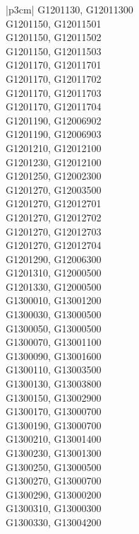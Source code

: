 \begin{customLongTable}{ |p{3cm}| }
G1201130, G12011300 \\ \hline
G1201150, G12011501 \\ \hline
G1201150, G12011502 \\ \hline
G1201150, G12011503 \\ \hline
G1201170, G12011701 \\ \hline
G1201170, G12011702 \\ \hline
G1201170, G12011703 \\ \hline
G1201170, G12011704 \\ \hline
G1201190, G12006902 \\ \hline
G1201190, G12006903 \\ \hline
G1201210, G12012100 \\ \hline
G1201230, G12012100 \\ \hline
G1201250, G12002300 \\ \hline
G1201270, G12003500 \\ \hline
G1201270, G12012701 \\ \hline
G1201270, G12012702 \\ \hline
G1201270, G12012703 \\ \hline
G1201270, G12012704 \\ \hline
G1201290, G12006300 \\ \hline
G1201310, G12000500 \\ \hline
G1201330, G12000500 \\ \hline
G1300010, G13001200 \\ \hline
G1300030, G13000500 \\ \hline
G1300050, G13000500 \\ \hline
G1300070, G13001100 \\ \hline
G1300090, G13001600 \\ \hline
G1300110, G13003500 \\ \hline
G1300130, G13003800 \\ \hline
G1300150, G13002900 \\ \hline
G1300170, G13000700 \\ \hline
G1300190, G13000700 \\ \hline
G1300210, G13001400 \\ \hline
G1300230, G13001300 \\ \hline
G1300250, G13000500 \\ \hline
G1300270, G13000700 \\ \hline
G1300290, G13000200 \\ \hline
G1300310, G13000300 \\ \hline
G1300330, G13004200 \\ \hline

\end{customLongTable}
